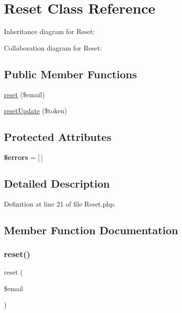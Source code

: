 \hypertarget{class_zest_1_1_auth_1_1_reset}{}\section{Reset Class Reference}
\label{class_zest_1_1_auth_1_1_reset}


Inheritance diagram for Reset\+:


Collaboration diagram for Reset\+:
\subsection*{Public Member Functions}
\begin{DoxyCompactItemize}
\item 
\mbox{\hyperlink{class_zest_1_1_auth_1_1_reset_af47e31ff0add02d09e58ea8764babc03}{reset}} (\$email)
\item 
\mbox{\hyperlink{class_zest_1_1_auth_1_1_reset_ad64c08a9ce4e24a30b099d3bc0b4c892}{reset\+Update}} (\$token)
\end{DoxyCompactItemize}
\subsection*{Protected Attributes}
\begin{DoxyCompactItemize}
\item 
\mbox{\label{class_zest_1_1_auth_1_1_reset_ab24faf4aa647cdcee494fc48524ad4ff}} 
{\bfseries \$errors} = \mbox{[}$\,$\mbox{]}
\end{DoxyCompactItemize}


\subsection{Detailed Description}


Definition at line 21 of file Reset.\+php.



\subsection{Member Function Documentation}
\mbox{\label{class_zest_1_1_auth_1_1_reset_af47e31ff0add02d09e58ea8764babc03}} 
\subsubsection{\texorpdfstring{reset()}{reset()}}
{\footnotesize\ttfamily reset (\begin{DoxyParamCaption}\item[{}]{\$email }\end{DoxyParamCaption})}

